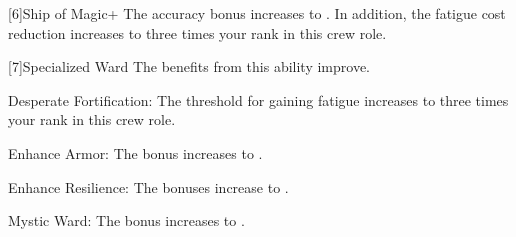         [6]{Ship of Magic+} The accuracy bonus increases to .
        In addition, the fatigue cost reduction increases to three times your rank in this crew role.

        [7]{Specialized Ward} The benefits from this ability improve.
        \begin{raggeditemize}
            \item Desperate Fortification: The threshold for gaining fatigue increases to three times your rank in this crew role.
            \item Enhance Armor: The bonus increases to .
            \item Enhance Resilience: The bonuses increase to .
            \item Mystic Ward: The bonus increases to .
        \end{raggeditemize}
